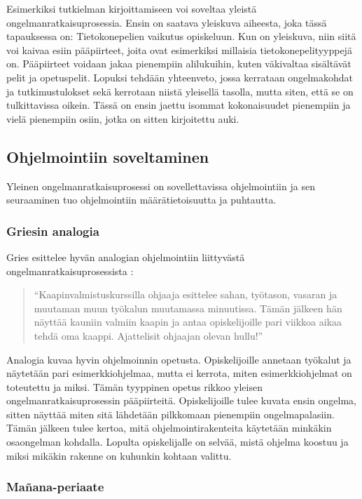 Esimerkiksi tutkielman kirjoittamiseen voi soveltaa yleistä
ongelmanratkaisuprosessia. Ensin on saatava yleiskuva aiheesta, joka tässä
tapauksessa on: Tietokonepelien vaikutus opiskeluun. Kun on yleiskuva, niin
siitä voi kaivaa esiin pääpiirteet, joita ovat esimerkiksi millaisia
tietokonepelityyppejä on. Pääpiirteet voidaan jakaa pienempiin alilukuihin,
kuten väkivaltaa sisältävät pelit ja opetuspelit. Lopuksi tehdään yhteenveto,
jossa kerrataan ongelmakohdat ja tutkimustulokset sekä kerrotaan niistä
yleisellä tasolla, mutta siten, että se on tulkittavissa oikein. Tässä on ensin
jaettu isommat kokonaisuudet pienempiin ja vielä pienempiin osiin, jotka on
sitten kirjoitettu auki.

\subsection{Ohjelmointiin soveltaminen}

Yleinen ongelmanratkaisuprosessi on sovellettavissa ohjelmointiin ja sen
seuraaminen tuo ohjelmointiin määrätietoisuutta ja puhtautta.

\subsubsection{Griesin analogia}

Gries esittelee hyvän analogian ohjelmointiin liittyvästä
ongelmanratkaisuprosessista \cite{Gries:1974:WTI:953057.810447}:

\begin{quotation}
``Kaapinvalmistuskurssilla ohjaaja esittelee sahan, työtason, vasaran ja
muutaman muun työkalun muutamassa minuutissa. Tämän jälkeen hän näyttää
kauniin valmiin kaapin ja antaa opiskelijoille pari viikkoa aikaa tehdä oma
kaappi. Ajattelisit ohjaajan olevan hullu!''
\end{quotation}

Analogia kuvaa hyvin ohjelmoinnin opetusta. Opiskelijoille annetaan työkalut ja
näytetään pari esimerkkiohjelmaa, mutta ei kerrota, miten esimerkkiohjelmat on
toteutettu ja miksi. Tämän tyyppinen opetus rikkoo yleisen
ongelmanratkaisuprosessin pääpiirteitä. Opiskelijoille tulee kuvata ensin
ongelma, sitten näyttää miten sitä lähdetään pilkkomaan pienempiin
ongelmapalasiin. Tämän jälkeen tulee kertoa, mitä ohjelmointirakenteita
käytetään minkäkin osaongelman kohdalla. Lopulta opiskelijalle on selvää, mistä
ohjelma koostuu ja miksi mikäkin rakenne on kuhunkin kohtaan valittu.

\subsubsection{Mañana-periaate}

